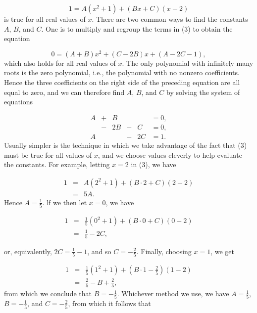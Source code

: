\begin{equation}
1 = A(x^2 + 1) + (Bx + C)(x - 2)
\label{eq7.4.3}
\end{equation}
\noindent is true for all real values of $x$. There are two common ways to find the constants $A$, $B$, and $C$. One is to multiply and regroup the terms in (3) to obtain the equation

$$
0 = (A + B)x^2 + (C - 2B)x + (A - 2C - 1),
$$
\noindent which also holds for all real values of $x$. The only polynomial with infinitely many roots is the zero polynomial, i.e., the polynomial with no nonzero coefficients. Hence the three coefficients on the right side of the preceding equation are all equal to zero, and we can therefore find $A$, $B$, and $C$ by solving the system of equations

$$
\begin{array}{ccrcrc}
A  &   + &    B &     &     & = 0,\\
    &    - &  2B & +  &  C & = 0,\\
A  &      &       &  - & 2C & = 1.
\end{array}
$$
\noindent Usually simpler is the technique in which we take advantage of the fact that (3) must be true for all values of $x$, and we choose values cleverly to help evaluate the constants. For example, letting $x = 2$ in (3), we have

\begin{eqnarray*}
1 &=& A(2^2 + 1) + (B \cdot 2 + C)(2 - 2)\\
   &=& 5A.
\end{eqnarray*}
\noindent Hence $A = \frac{1}{5}$. lf we then let $x = 0$, we have  
 
\begin{eqnarray*}
1 &=& \frac{1}{5}(0^2 + 1) + (B \cdot 0 + C)(0 - 2) \\
   &=& \frac{1}{5} - 2C,
\end{eqnarray*}
 
\noindent or, equivalently, $2C = \frac{1}{5} - 1$, and so $C = - \frac{2}{5}$. Finally, choosing $x = 1$, we get

\begin{eqnarray*}
1 &=&\frac{1}{5}(1^2 + 1) + (B \cdot 1 - \frac{2}{5})(1 - 2)\\
   &=& \frac{2}{5} - B + \frac{2}{5},
\end{eqnarray*}
\noindent from which we conclude that $B = - \frac{1}{5}$. Whichever method we use, we have $A = \frac{1}{5}$, $B = - \frac{1}{5}$, and $C = -\frac{2}{5}$, from which it follows that

